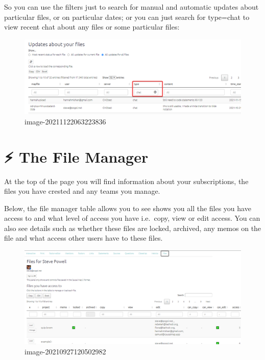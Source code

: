 \documentclass[
]{book}
\begin{document}
So you can use the filters just to search for manual and automatic updates about particular files, or on particular dates; or you can just search for type=chat to view recent chat about any files or some particular files:

\begin{figure}
\centering
\includegraphics{_assets/image-20211122063223836.png}
\caption{image-20211122063223836}
\end{figure}

\hypertarget{xfile-manager}{%
\chapter{⚡ The File Manager}\label{xfile-manager}}

At the top of the page you will find information about your subscriptions, the files you have crested and any teams you manage.

Below, the file manager table allows you to see shows you all the files you have access to and what level of access you have i.e.~copy, view or edit access. You can also see details such as whether these files are locked, archived, any memos on the file and what access other users have to these files.

\begin{figure}
\centering
\includegraphics[width=6.77083in,height=\textheight]{_assets/image-20210927120502982.png}
\caption{image-20210927120502982}
\end{figure}
\end{document}
